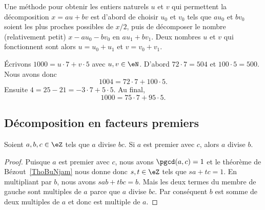 \begin{normaltext}
	Une méthode pour obtenir les entiers naturels \( u\) et \( v\) qui permettent la décomposition \(x = au + bv \) est d'abord de choisir \( u_0\) et \( v_0\) tels que \( au_0 \) et \( bv_0 \) soient les plus proches possibles de \( x/2\), puis de décomposer le nombre (relativement petit) \( x - au_0 - bv_0 \) en \( au_1 + bv_1 \). Deux nombres \( u\) et \( v\) qui fonctionnent sont alors \( u = u_0 + u_1\) et \( v = v_0 + v_1\).
\end{normaltext}

\begin{example}
	Écrivons \( 1000=u\cdot 7+v\cdot 5\) avec \( u,v\in \eN\). D'abord \( 72\cdot 7=504\) et \( 100\cdot 5=500\). Nous avons donc
	\begin{equation}
		1004=72\cdot 7+100\cdot 5.
	\end{equation}
	Ensuite \( 4=25-21=-3\cdot 7+5\cdot 5\). Au final,
	\begin{equation}
		1000=75\cdot 7+95\cdot 5.
	\end{equation}
\end{example}


\subsection{Décomposition en facteurs premiers}

\begin{lemma}    \label{LemPRuUrsD}
	Soient \( a,b,c\in \eZ\) tels que \( a\) divise \( bc\). Si \( a\) est premier avec \( c\), alors \( a\) divise \( b\).
\end{lemma}

\begin{proof}
	Puisque \( a\) est premier avec \( c\), nous avons \( \pgcd(a,c)=1\) et le théorème de Bézout~\ref{ThoBuNjam} nous donne donc \( s,t\in \eZ\) tels que \( sa+tc=1\). En multipliant par \( b\), nous avons \( sab+tbc=b\). Mais les deux termes du membre de gauche sont multiples de \( a\) parce que \( a\) divise \( bc\). Par conséquent \( b\) est somme de deux multiples de \( a\) et donc est multiple de \( a\).
\end{proof}

